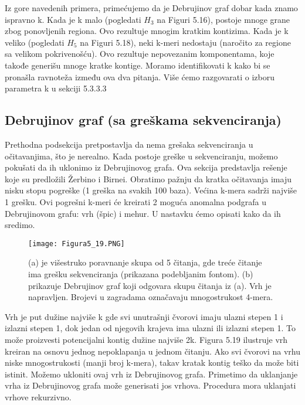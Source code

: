 \documentclass{article}
\begin{document}
Iz gore navedenih primera, primećujemo da je Debrujinov graf dobar kada znamo ispravno k. Kada je k malo (pogledati $H_3$ na Figuri 5.16), postoje mnoge grane zbog ponovljenih regiona. Ovo rezultuje mnogim kratkim kontizima. Kada je k veliko (pogledati $H_5$ na Figuri 5.18), neki k-meri nedostaju (naročito za regione sa velikom pokrivenošću). Ovo rezultuje nepovezanim komponentama, koje takođe generišu mnoge kratke kontige. Moramo identifikovati k kako bi se pronašla ravnoteža između ova dva pitanja. Više ćemo razgovarati o izboru parametra k u sekciji 5.3.3.3 \\

\subsection{Debrujinov graf (sa greškama sekvenciranja)}

Prethodna podsekcija pretpostavlja da nema grešaka sekvenciranja u očitavanjima, što je nerealno. Kada postoje greške u sekvenciranju, možemo pokušati da ih uklonimo iz Debrujinovog grafa. Ova sekcija predstavlja rešenje koje su predložili Žerbino i Birnei. Obratimo pažnju da kratka očitavanja imaju nisku stopu pogreške (1 greška na svakih 100 baza). Većina k-mera sadrži najviše 1 grešku. Ovi pogrešni k-meri će kreirati 2 moguća anomalna podgrafa u Debrujinovom grafu: vrh (špic) i mehur. U nastavku ćemo opisati kako da ih sredimo.\\

\begin{figure}[h]
\centering
\texttt{[image: Figura5\_19.PNG]}
\caption{(a) je višestruko poravnanje skupa od 5 čitanja, gde treće čitanje ima grešku sekvenciranja (prikazana podebljanim fontom). (b) prikazuje Debrujinov graf koji odgovara skupu čitanja iz (a). Vrh je napravljen. Brojevi u zagradama označavaju mnogostrukost 4-mera.}
\end{figure}

Vrh je put dužine najviše k gde svi unutrašnji čvorovi imaju ulazni stepen 1 i izlazni stepen 1, dok jedan od njegovih krajeva ima ulazni ili izlazni stepen 1. To može proizvesti potencijalni kontig  dužine najviše 2k. Figura 5.19 ilustruje vrh kreiran na osnovu jednog nepoklapanja u jednom čitanju. Ako svi čvorovi na vrhu niske mnogostrukosti (manji broj k-mera), takav kratak kontig teško da može biti istinit. Možemo ukloniti ovaj vrh iz Debrujinovog grafa. Primetimo da uklanjanje vrha iz Debrujinovog grafa može generisati jos vrhova. Procedura mora uklanjati vrhove rekurzivno. \\
\end{document}
